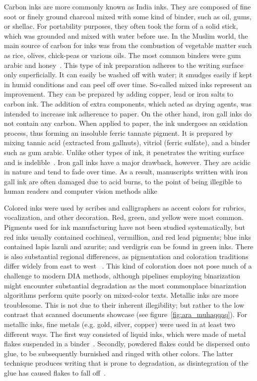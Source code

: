 Carbon inks are more commonly known as India inks. They are composed of fine
soot or finely ground charcoal mixed with some kind of binder, such as oil,
gums, or shellac. For portability purposes, they often took the form of a solid
stick, which was grounded and mixed with water before use. In the Muslim world,
the main source of carbon for inks was from the combustion of vegetable matter
such as rice, olives, chick-peas or various oils. The most common binders were
gum arabic and honey~\cite[pg. 133]{gacek2009arabic}. This type of ink
preparation adheres to the writing surface only superficially. It can easily be
washed off with water; it smudges easily if kept in humid conditions and can
peel off over time. So-called mixed inks represent an improvement. They can be
prepared by adding copper, lead or iron salts to carbon ink. The addition of
extra components, which acted as drying agents, was intended to increase ink
adherence to paper. On the other hand, iron gall inks do not contain any
carbon. When applied to paper, the ink undergoes an oxidation process, thus
forming an insoluble ferric tannate pigment. It is prepared by mixing tannic
acid (extracted from gallnuts), vitriol (ferric sulfate), and a binder such as
gum arabic. Unlike other types of ink, it penetrates the writing surface and is
indelible~\cite{christiansen2017manufacture}. Iron gall inks have a major
drawback, however. They are acidic in nature and tend to fade over time. As a
result, manuscripts written with iron gall ink are often damaged due to acid
burns, to the point of being illegible to human readers and computer vision
methods alike~\cite[pg. 145]{gacek2009arabic}

Colored inks were used by scribes and calligraphers as accent colors for
rubrics, vocalization, and other decoration. Red, green, and yellow were most
common. Pigments used for ink manufacturing have not been studied
systematically, but red inks usually contained cochineal, vermillion, and red
lead pigments; blue inks contained lapis lazuli and azurite; and verdigris can be
found in green inks. There is also substantial regional differences, as
pigmentation and coloration traditions differ widely from east to west
~\cite[pg. 63]{blair2006islamic}. This kind of coloration does not pose much of
a challenge to modern DIA methods, although pipe\-lines employing binarization
might encounter substantial degradation as the most commonplace binarization
algorithms perform quite poorly on mixed-color texts. Metallic inks are more
troublesome. This is not due to their inherent illegibility; but rather to the
low contrast that scanned documents showcase (see
figure~\ref{fig:ara_muhaqqaq}). For metallic inks, fine metals (e.g. gold,
silver, copper) were used in at least two different ways. The first way
consisted of liquid inks, which were made of metal flakes suspended in a
binder~\cite[pg. 225-227]{raggetti2019inks}. Secondly, powdered flakes could be
dispersed onto glue, to be subsequently burnished and ringed with other colors.
The latter technique produces writing that is prone to degradation, as
disintegration of the glue has caused flakes to fall off~\cite[pg.
63]{blair2006islamic}.

